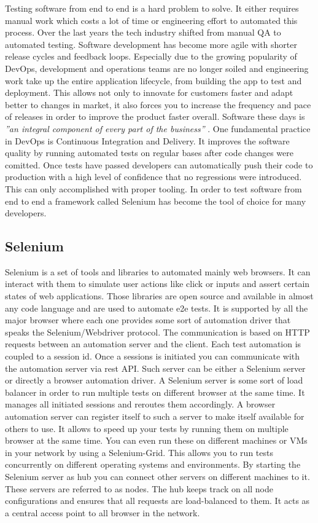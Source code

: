 Testing software from end to end is a hard problem to solve. It either requires manual work
which costs a lot of time or engineering effort to automated this process. Over the last
years the tech industry shifted from manual QA to automated testing. Software development
has become more agile with shorter release cycles and feedback loops. Especially due to the
growing popularity of DevOps, development and operations teams are no longer soiled and
engineering work take up the entire application lifecycle, from building the app to test and
deployment. This allows not only to innovate for customers faster and adapt better to changes
in market, it also forces you to increase the frequency and pace of releases in order to
improve the product faster overall. Software these days is \textit{''an integral component
of every part of the business''} \cite{devops}. One fundamental practice in DevOps is
Continuous Integration and Delivery. It improves the software quality by running automated
tests on regular bases after code changes were comitted. Once tests have passed developers
can automatically push their code to production with a high level of confidence that no
regressions were introduced. This can only accomplished with proper tooling. In order to test
software from end to end a framework called Selenium has become the tool of choice for many
developers.

\subsection{Selenium\label{sec:history}}

Selenium is a set of tools and libraries to automated mainly web browsers. It can interact
with them to simulate user actions like click or inputs and assert certain states of web
applications. Those libraries are open source and available in almost any code language and
are used to automate e2e tests. It is supported by all the major browser where each one
provides some sort of automation driver that speaks the Selenium/Webdriver protocol. The
communication is based on HTTP requests between an automation server and the client. Each
test automation is coupled to a session id. Once a sessions is initiated you can communicate
with the automation server via rest API. Such server can be either a Selenium server or directly
a browser automation driver. A Selenium server is some sort of load balancer in order to run
multiple tests on different browser at the same time. It manages all initiated sessions and
reroutes them accordingly. A browser automation server can register itself to such a server
to make itself available for others to use. It allows to speed up your tests by running them
on multiple browser at the same time. You can even run these on different machines or VMs in
your network by using a Selenium-Grid. This allows you to run tests concurrently on different
operating systems and environments. By starting the Selenium server as hub you can connect other
servers on different machines to it. These servers are referred to as nodes. The hub keeps
track on all node configurations and ensures that all requests are load-balanced to them. It
acts as a central access point to all browser in the network.

